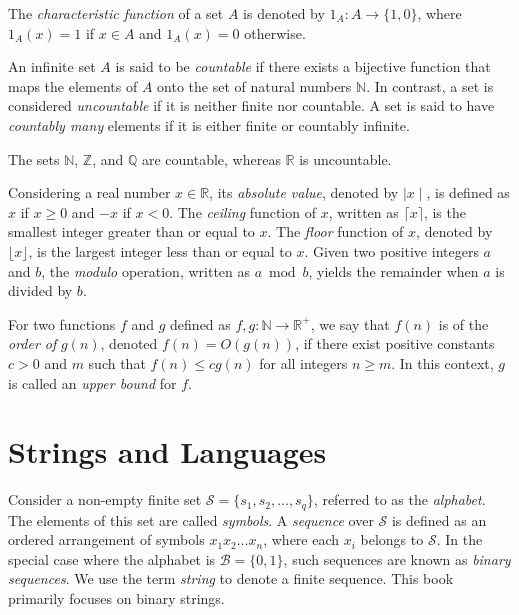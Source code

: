 The \emph{characteristic function} of a set $A$ is denoted by $1_A : A \rightarrow \{1, 0\}$, where $1_A(x) = 1$ if $x \in A$ and $1_A(x) = 0$ otherwise.

An infinite set $A$ is said to be \emph{countable} if there exists a bijective function that maps the elements of $A$ onto the set of natural numbers $\mathbb{N}$. In contrast, a set is considered \emph{uncountable} if it is neither finite nor countable. A set is said to have \emph{countably many} elements if it is either finite or countably infinite.

\begin{example}
The sets $\mathbb{N}$, $\mathbb{Z}$, and $\mathbb{Q}$ are countable, whereas $\mathbb{R}$ is uncountable.
\end{example}

Considering a real number $x \in \mathbb{R}$, its \emph{absolute value}, denoted by $\mid x \mid$, is defined as $x$ if $x \geq 0$ and $-x$ if $x < 0$. The \emph{ceiling} function of $x$, written as $\lceil x \rceil$, is the smallest integer greater than or equal to $x$. The \emph{floor} function of $x$, denoted by $\lfloor x \rfloor$, is the largest integer less than or equal to $x$. Given two positive integers $a$ and $b$, the \emph{modulo} operation, written as $a \bmod b$, yields the remainder when $a$ is divided by $b$.

For two functions $f$ and $g$ defined as $f, g : \mathbb{N} \rightarrow \mathbb{R}^{+}$, we say that $f(n)$ is of the \emph{order of} $g(n)$, denoted $f(n) = O(g(n))$, if there exist positive constants $c > 0$ and $m$ such that $f(n) \leq c g(n)$ for all integers $n \geq m$. In this context, $g$ is called an \emph{upper bound} for $f$.

%
%

\section{Strings and Languages}
\label{sec:strings}

Consider a non-empty finite set $\mathcal{S} = \{ s_1, s_2, \ldots, s_q \}$, referred to as the \emph{alphabet}. The elements of this set are called \emph{symbols}. A \emph{sequence} over $\mathcal{S}$ is defined as an ordered arrangement of symbols $x_1 x_2 \dots x_n$, where each $x_i$ belongs to $\mathcal{S}$. In the special case where the alphabet is $\mathcal{B} = \{0, 1\}$, such sequences are known as \emph{binary sequences}. We use the term \emph{string} to denote a finite sequence. This book primarily focuses on binary strings.


